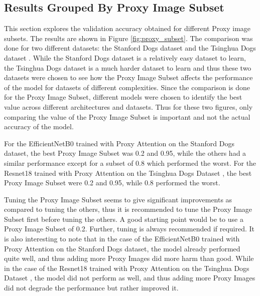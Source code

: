 \documentclass[a4paper,11pt,openright]{book}
\begin{document}
\subsection{Results Grouped By Proxy Image Subset}
This section explores the validation accuracy obtained for different Proxy image subsets. The results are shown in Figure \ref{fig:proxy_subset}.
The comparison was done for two different datasets: the Stanford Dogs dataset \cite{khoslaNovelDatasetFineGrained} and the Tsinghua Dogs dataset \cite{zouNewDatasetDog2020}. While the Stanford Dogs dataset is a relatively easy dataset to learn, the Tsinghua Dogs dataset is a much harder dataset to learn and thus these two datasets were chosen to see how the Proxy Image Subset affects the performance of the model for datasets of different complexities. Since the comparison is done for the Proxy Image Subset, different models were chosen to identify the best value across different architectures and datasets. Thus for these two figures, only comparing the value of the Proxy Image Subset is important and not the actual accuracy of the model.

For the EfficientNetB0 \cite{tanEfficientnetRethinkingModel2019} trained with Proxy Attention on the Stanford Dogs dataset\cite{khoslaNovelDatasetFineGrained}, the best Proxy Image Subset was 0.2 and 0.95, while the others had a similar performance except for a subset of 0.8 which performed the worst. For the Resnet18 \cite{heDeepResidualLearning2016} trained with Proxy Attention on the Tsinghua Dogs Dataset \cite{zouNewDatasetDog2020}, the best Proxy Image Subset were 0.2 and 0.95, while 0.8 performed the worst.

Tuning the Proxy Image Subset seems to give significant improvements as compared to tuning the others, thus it is recommended to tune the Proxy Image Subset first before tuning the others. A good starting point would be to use a Proxy Image Subset of 0.2. Further, tuning is always recommended if required.
It is also interesting to note that in the case of the EfficientNetB0 \cite{tanEfficientnetRethinkingModel2019} trained with Proxy Attention on the Stanford Dogs dataset\cite{khoslaNovelDatasetFineGrained}, the model already performed quite well, and thus adding more Proxy Images did more harm than good. While in the case of the Resnet18 \cite{heDeepResidualLearning2016} trained with Proxy Attention on the Tsinghua Dogs Dataset \cite{zouNewDatasetDog2020}, the model did not perform as well, and thus adding more Proxy Images did not degrade the performance but rather improved it.
\end{document}

